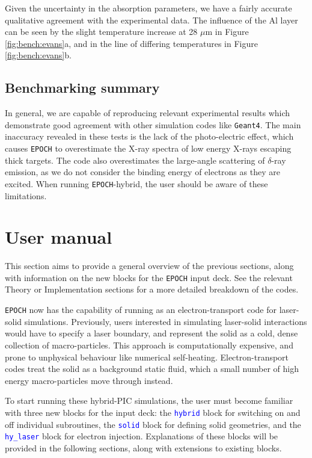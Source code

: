 \documentclass[12pt]{article}
\numberwithin{equation}{section}
\begin{document}
Given the uncertainty in the absorption parameters, we have a fairly accurate qualitative agreement with the experimental data. The influence of the Al layer can be seen by the slight temperature increase at 28 $\mu$m in Figure \ref{fig:bench:evans}a, and in the line of differing temperatures in Figure \ref{fig:bench:evans}b.

\subsection{Benchmarking summary}

In general, we are capable of reproducing relevant experimental results which demonstrate good agreement with other simulation codes like \texttt{Geant4}. The main inaccuracy revealed in these tests is the lack of the photo-electric effect, which causes \texttt{EPOCH} to overestimate the X-ray spectra of low energy X-rays escaping thick targets. The code also overestimates the large-angle scattering of $\delta$-ray emission, as we do not consider the binding energy of electrons as they are excited. When running \texttt{EPOCH}-hybrid, the user should be aware of these limitations.

\section{User manual} \label{sec:user}

This section aims to provide a general overview of the previous sections, along with information on the new blocks for the \texttt{EPOCH} input deck. See the relevant Theory or Implementation sections for a more detailed breakdown of the codes.

\texttt{EPOCH} now has the capability of running as an electron-transport code for laser-solid simulations. Previously, users interested in simulating laser-solid interactions would have to specify a laser boundary, and represent the solid as a cold, dense collection of macro-particles. This approach is computationally expensive, and prone to unphysical behaviour like numerical self-heating. Electron-transport codes treat the solid as a background static fluid, which a small number of high energy macro-particles move through instead.

To start running these hybrid-PIC simulations, the user must become familiar with three new blocks for the input deck: the \textcolor{blue}{\texttt{hybrid}} block for switching on and off individual subroutines, the \textcolor{blue}{\texttt{solid}} block for defining solid geometries, and the \textcolor{blue}{\texttt{hy\_laser}} block for electron injection. Explanations of these blocks will be provided in the following sections, along with extensions to existing blocks.
\end{document}
